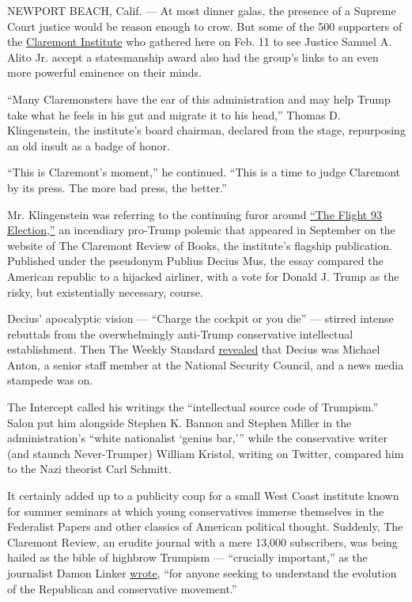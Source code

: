 NEWPORT BEACH, Calif. --- At most dinner galas, the presence of a
Supreme Court justice would be reason enough to crow. But some of the
500 supporters of the \href{http://www.claremont.org/}{Claremont
Institute} who gathered here on Feb. 11 to see Justice Samuel A. Alito
Jr. accept a statesmanship award also had the group's links to an even
more powerful eminence on their minds.

``Many Claremonsters have the ear of this administration and may help
Trump take what he feels in his gut and migrate it to his head,'' Thomas
D. Klingenstein, the institute's board chairman, declared from the
stage, repurposing an old insult as a badge of honor.

``This is Claremont's moment,'' he continued. ``This is a time to judge
Claremont by its press. The more bad press, the better.''

Mr. Klingenstein was referring to the continuing furor around
\href{http://www.claremont.org/crb/basicpage/the-flight-93-election/}{``The
Flight 93 Election,''} an incendiary pro-Trump polemic that appeared in
September on the website of The Claremont Review of Books, the
institute's flagship publication. Published under the pseudonym Publius
Decius Mus, the essay compared the American republic to a hijacked
airliner, with a vote for Donald J. Trump as the risky, but
existentially necessary, course.

Decius' apocalyptic vision --- ``Charge the cockpit or you die'' ---
stirred intense rebuttals from the overwhelmingly anti-Trump
conservative intellectual establishment. Then The Weekly Standard
\href{http://www.weeklystandard.com/the-anonymous-pro-trump-decius-now-works-inside-the-white-house/article/2006623}{revealed}
that Decius was Michael Anton, a senior staff member at the National
Security Council, and a news media stampede was on.

The Intercept called his writings the ``intellectual source code of
Trumpism.'' Salon put him alongside Stephen K. Bannon and Stephen Miller
in the administration's ``white nationalist `genius bar,''' while the
conservative writer (and staunch Never-Trumper) William Kristol, writing
on Twitter, compared him to the Nazi theorist Carl Schmitt.

It certainly added up to a publicity coup for a small West Coast
institute known for summer seminars at which young conservatives immerse
themselves in the Federalist Papers and other classics of American
political thought. Suddenly, The Claremont Review, an erudite journal
with a mere 13,000 subscribers, was being hailed as the bible of
highbrow Trumpism --- ``crucially important,'' as the journalist Damon
Linker
\href{http://theweek.com/articles/678310/why-many-conservative-intellectuals-became-trumpists}{wrote},
``for anyone seeking to understand the evolution of the Republican and
conservative movement.''

